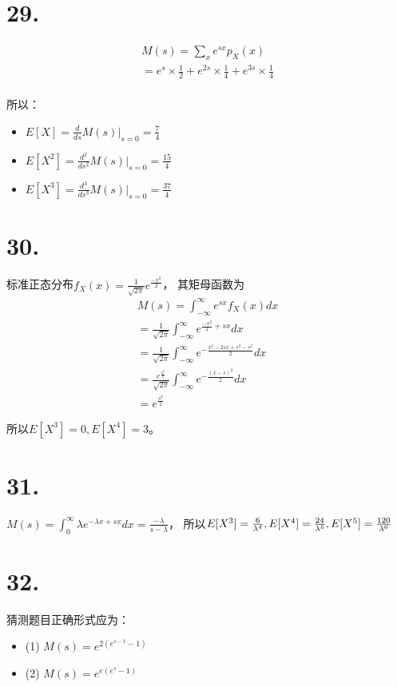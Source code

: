 \documentclass[UTF8]{report}
\begin{document}
    \section*{29.}
        $$\begin{array}{l}
            M(s) = \sum_{x}e^{sx}p_X(x)\\
            = e^s \times \frac{1}{2} + e^{2s} \times \frac{1}{4} + e^{3s} \times \frac{1}{4}\\
        \end{array}$$

        所以：
        \begin{itemize}
            \item $E[X] = \frac{d}{ds}M(s)|_{s = 0} = \frac{7}{4}$
            \item $E[X^2] = \frac{d^2}{ds^2}M(s)|_{s = 0} = \frac{15}{4}$
            \item $E[X^3] = \frac{d^3}{ds^3}M(s)|_{s = 0} = \frac{37}{4}$
        \end{itemize}
    \section*{30.}
        标准正态分布$f_X(x) = \frac{1}{\sqrt{2\pi}}e^{\frac{-x^2}{2}}$，
        其矩母函数为
        $$\begin{array}{l}
            M(s) = \int_{-\infty}^{\infty}e^{sx}f_X(x)dx\\
            = \frac{1}{\sqrt{2\pi}}\int_{-\infty}^{\infty}e^{\frac{-x^2}{2} + sx}dx\\
            = \frac{1}{\sqrt{2\pi}}\int_{-\infty}^{\infty}e^{-\frac{x^2 - 2sx + s^2 - s^2}{2}}dx\\
            = \frac{e^{\frac{s^2}{2}}}{\sqrt{2\pi}}\int_{-\infty}^{\infty}e^{-\frac{(x - s)^2}{2}}dx\\
            = e^{\frac{s^2}{2}}
        \end{array}$$

        所以$E[X^3] = 0, E[X^4] = 3$。
    \section*{31.}
        $M(s) = \int_{0}^{\infty}\lambda e^{-\lambda x + sx}dx = \frac{-\lambda}{s - \lambda}$，
        所以$E[X^3] = \frac{6}{\lambda^4}, E[X^4] = \frac{24}{\lambda^5},\\ E[X^5] = \frac{120}{\lambda^6}$
    \section*{32.}
        猜测题目正确形式应为：
        \begin{itemize}
            \item (1) $M(s) = e^{2(e^{s - 1} - 1)}$
            \item (2) $M(s) = e^{e(e^s - 1)}$
        \end{itemize}
\end{document}
